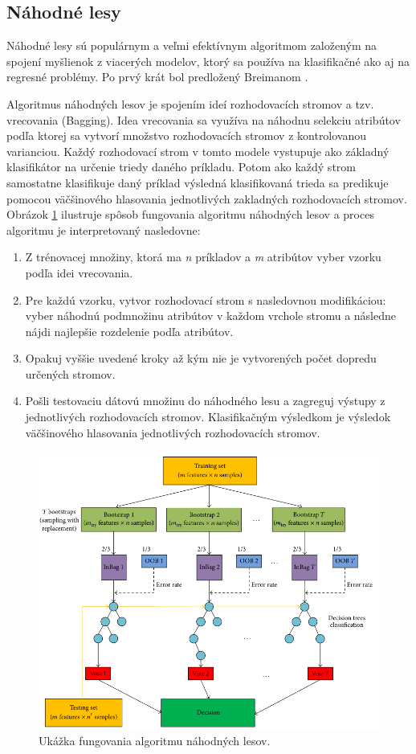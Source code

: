 \subsection{Náhodné lesy}
Náhodné lesy sú populárnym a veľmi efektívnym algoritmom založeným na spojení myšlienok z viacerých modelov, ktorý sa používa na klasifikačné ako aj na regresné problémy. Po prvý krát bol predložený Breimanom \cite{Breiman2001}.\par
Algoritmus náhodných lesov je spojením ideí rozhodovacích stromov a tzv. vrecovania (Bagging). Idea vrecovania sa využíva na náhodnu selekciu atribútov podľa ktorej sa vytvorí množstvo rozhodovacích stromov z kontrolovanou varianciou. Každý rozhodovací strom v tomto modele vystupuje ako základný klasifikátor na určenie triedy daného príkladu. Potom ako každý strom samostatne klasifikuje daný príklad výsledná klasifikovaná trieda sa predikuje pomocou väčšinového hlasovania jednotlivých zakladných rozhodovacích stromov.
Obrázok \ref{img:rf_workflow} ilustruje spôsob fungovania algoritmu náhodných lesov a proces algoritmu je interpretovaný nasledovne:
\begin{enumerate}
  \item Z trénovacej množiny, ktorá ma \textit{n} príkladov a \textit{m} atribútov vyber vzorku podľa idei vrecovania.
  \item Pre každú vzorku, vytvor rozhodovací strom s nasledovnou modifikáciou: vyber náhodnú podmnožinu atribútov v každom vrchole stromu a následne nájdi najlepšie rozdelenie podľa atribútov.
  \item Opakuj vyššie uvedené kroky až kým nie je vytvorených počet dopredu určených stromov.
  \item Pošli testovaciu dátovú množinu do náhodného lesu a zagreguj výstupy z jednotlivých rozhodovacích stromov. Klasifikačným výsledkom je výsledok väčšinového hlasovania jednotlivých rozhodovacích stromov.
\end{enumerate}
\begin{figure}[H]
	\begin{center}
		\includegraphics[scale=0.6]{img/rf_workflow.png}
		\caption{Ukážka fungovania algoritmu náhodných lesov.}
		\label{img:rf_workflow}
	\end{center}
\end{figure}
